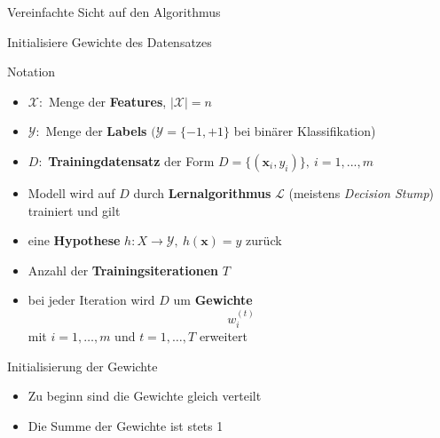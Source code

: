 \documentclass[hyperref={bookmarks=false},11pt,dvipsnames]{beamer}
\begin{document}
\begin{frame}{Vereinfachte Sicht auf den Algorithmus}
	\begin{algorithm}[H]
		\DontPrintSemicolon
		\LinesNotNumbered
		\BlankLine
		Initialisiere Gewichte des Datensatzes\;
	\end{algorithm}
\end{frame}

\begin{frame}[t]{Notation}
	\begin{itemize}
		\item <1-> $\mathcal{X}:$ Menge der \textbf{Features}, $|\mathcal{X}|=n$
		\item <2-> $\mathcal{Y}:$ Menge der \textbf{Labels} $(\mathcal{Y}=\{-1,+1\}$ bei binärer Klassifikation)
		\item <3-> $D:$ \textbf{Trainingdatensatz} der Form $D=\{(\boldsymbol{x}_i,y_i)\},~i=1,...,m$
		\item <4-> Modell wird auf $D$ durch \textbf{Lernalgorithmus} $\mathcal{L}$ (meistens \emph{Decision Stump}) trainiert und gilt
		\item <5-> eine \textbf{Hypothese} $h:X\rightarrow\mathcal{Y},~h(\boldsymbol{x})=y$ zurück
		\item <6-> Anzahl der \textbf{Trainingsiterationen} $T$
		\item <7-> bei jeder Iteration wird $D$ um \textbf{Gewichte} $$w^{(t)}_i$$ mit $i=1,\dots,m$ und $t=1,\dots,T$ erweitert
	\end{itemize}
\end{frame}

\begin{frame}[t]{Initialisierung der Gewichte}
	\begin{itemize}
		\item <1-> Zu beginn sind die Gewichte gleich verteilt 
		\item <2-> Die Summe der Gewichte ist stets 1 
	\end{itemize}
\end{frame}
\end{document}
